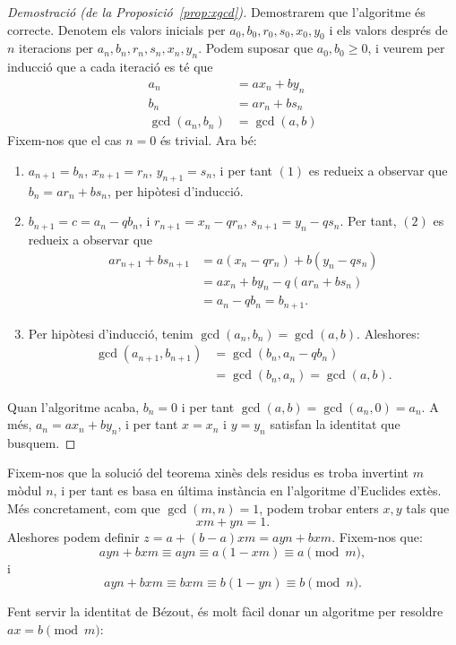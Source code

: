  \begin{proof}[Demostració (de la Proposició~\ref{prop:xgcd})]
    Demostrarem que l'algoritme és correcte. Denotem els valors inicials per $a_0, b_0, r_0, s_0, x_0, y_0$ i els valors després de $n$ iteracions per $a_n, b_n, r_n, s_n, x_n, y_n$. Podem suposar que $a_0, b_0\geq 0$, i veurem per inducció que a cada iteració es té que
    \begin{align*}
    a_n &= a x_n + b y_n\\
    b_n &= a r_n + b s_n\\
    \gcd(a_n,b_n)&=\gcd(a,b)
    \end{align*}
    Fixem-nos que el cas $n=0$ és trivial. Ara bé:
    \begin{enumerate}
        \item $a_{n+1} = b_n$, $x_{n+1} = r_n$, $y_{n+1}=s_n$, i per tant $(1)$ es redueix a observar que $b_n = a r_n + b s_n$, per hipòtesi d'inducció.
        \item $b_{n+1} = c = a_n - qb_n$, i $r_{n+1} = x_n-qr_n$, $s_{n+1} = y_n-qs_n$. Per tant, $(2)$ es redueix a observar que
        \begin{align*}
        ar_{n+1}+bs_{n+1}&=a(x_n-qr_n) + b(y_n-qs_n)\\
        &=ax_n+by_n -q(ar_n+bs_n)\\
        &=a_n-qb_n =b_{n+1}.
        \end{align*}
        \item Per hipòtesi d'inducció, tenim $\gcd(a_n,b_n)=\gcd(a,b)$. Aleshores:
        \begin{align*}
        \gcd(a_{n+1},b_{n+1})&=\gcd(b_n,a_n-qb_n)\\
        &=\gcd(b_n,a_n)=\gcd(a,b).
        \end{align*}
    \end{enumerate}
Quan l'algoritme acaba, $b_n=0$ i per tant $\gcd(a,b)=\gcd(a_n,0)=a_n$. A més, $a_n = ax_n+by_n$, i per tant $x=x_n$ i $y=y_n$ satisfan la identitat que busquem.
 \end{proof}

  \begin{remark}
  Fixem-nos que la solució del teorema xinès dels residus es troba invertint $m$ mòdul $n$, i per tant es basa en última instància en l'algoritme d'Euclides extès. Més concretament, com que $\gcd(m,n)=1$, podem trobar enters $x,y$ tals que
  \[
  xm+yn=1.
  \]
  Aleshores podem definir $z=a + (b-a)xm=ayn + bxm$. Fixem-nos que:
  \[
  ayn + bxm \equiv ayn \equiv a(1-xm)\equiv a\pmod m,
  \]
  i
  \[
  ayn + bxm \equiv bxm \equiv b(1-yn)\equiv b\pmod n.
  \]
  \end{remark}
 Fent servir la identitat de Bézout, és molt fàcil donar un algoritme per resoldre $ax = b\pmod m$:
 
